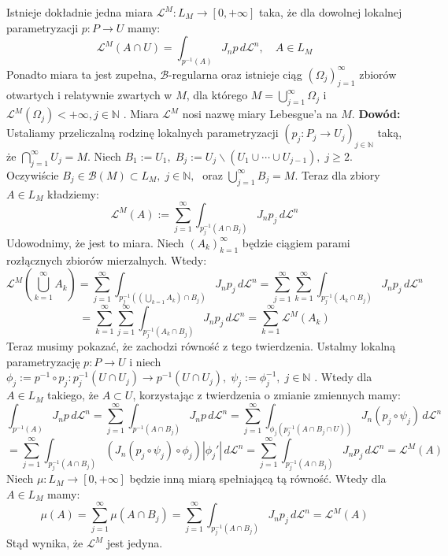 \begin{tw}
	Istnieje dokładnie jedna miara $\mathcal{L}^M: L_M \rightarrow [0, +\infty]$ taka, że dla dowolnej lokalnej parametryzacji $p: P \rightarrow U$ mamy: $$
		\mathcal{L}^M(A \cap U) = \int_{p^{-1}(A)} J_np \, d \mathcal{L}^n, \quad A \in L_M
	$$
	Ponadto miara ta jest zupełna, $\mathcal{B}$-regularna oraz istnieje ciąg $(\Omega_j)_{j=1}^{\infty}$ zbiorów otwartych i relatywnie zwartych w $M$, dla którego $M = \bigcup_{j=1}^{\infty} \Omega_j$ i $\mathcal{L}^M(\Omega_j) < +\infty, j \in \mathbb{N}$ . Miara $\mathcal{L}^M$ nosi nazwę miary Lebesgue'a na $M$.
	\newline
	\textbf{Dowód:}\newline
	Ustaliamy przeliczalną rodzinę lokalnych parametryzacji $(p_j: P_j \rightarrow U_j)_{j \in \mathbb{N}}$ taką, że $\bigcap_{j=1}^{\infty} U_j = M$. Niech $B_1:= U_1, \; B_j := U_j \backslash (U_1 \cup \cdots \cup U_{j-1}), \; j \geq 2$. Oczywiście $B_j \in \mathcal{B}(M) \subset L_M, \; j \in \mathbb{N},\;$ oraz $\bigcup_{j=1}^{\infty} B_j = M$. Teraz dla zbiory $A \in L_M$ kładziemy: $$
		\mathcal{L}^M(A) := \sum_{j=1}^{\infty} \int_{p_j^{-1}(A \cap B_j)} J_np_j \, d\mathcal{L}^n
	$$
	Udowodnimy, że jest to miara. Niech $(A_k)_{k=1}^{\infty}$ będzie ciągiem parami rozłącznych zbiorów mierzalnych. Wtedy: 
	$$
		\mathcal{L}^M(\bigcup_{k=1}^{\infty} A_k) 
		= \sum^{\infty}_{j=1} \int_{p_j^{-1}((\bigcup_{k=1} A_k) \cap B_j)} J_np_j \, d\mathcal{L}^n
		= \sum_{j=1}^{\infty} \sum_{k=1}^{\infty} \int_{p_j^{-1}(A_k \cap B_j)} J_np_j \, d \mathcal{L}^n
	$$
	$$
		= \sum_{k=1}^{\infty} \sum_{j=1}^{\infty} \int_{p_j^{-1}(A_k \cap B_j)} J_np_j \, d \mathcal{L}^n
		= \sum_{k=1}^{\infty} \mathcal{L}^M(A_k)
	$$
	Teraz musimy pokazać, że zachodzi równość z tego twierdzenia. Ustalmy lokalną parametryzację $p: P \rightarrow U$  i niech $\phi_j := p^{-1} \circ p_j:p^{-1}_j(U \cap U_j) \rightarrow p^{-1}(U \cap U_j), \; \psi_j := \phi_j^{-1}, \; j \in \mathbb{N}$ . Wtedy dla $A \in L_M$ takiego, że $A \subset U$, korzystając z twierdzenia o zmianie zmiennych mamy: $$
		\int_{p^{-1}(A)} J_np \, d \mathcal{L}^n
		= \sum_{j=1}^{\infty} \int_{p^{-1}(A \cap B_j)} J_np \, d \mathcal{L}^n
		= \sum_{j=1}^{\infty} \int_{\phi_j(p_j^{-1}(A \cap B_j \cap U))} J_n(p_j \circ \psi_j) \, d \mathcal{L}^n
	$$
	$$
		= \sum_{j=1}^{\infty} \int_{p_j^{-1}(A \cap B_j)} (J_n(p_j \circ \psi_j) \circ \phi_j) |\phi_j'| \, d \mathcal{L}^n
		= \sum_{j=1}^{\infty} \int_{p_j^{-1}(A \cap B_j)} J_np_j \, d \mathcal{L}^n = \mathcal{L}^M(A)
	$$
	Niech $\mu: L_M \rightarrow [0, +\infty]$ będzie inną miarą spełniającą tą równość. Wtedy dla $A \in L_M$ mamy: $$
		\mu(A) = \sum_{j=1}^{\infty} \mu(A \cap B_j) = \sum_{j=1}^{\infty} \int_{p_j^{-1}(A \cap B_j)} J_np_j \, d \mathcal{L}^n = \mathcal{L}^M(A)
	$$
	Stąd wynika, że $\mathcal{L}^M$ jest jedyna.
\end{tw}